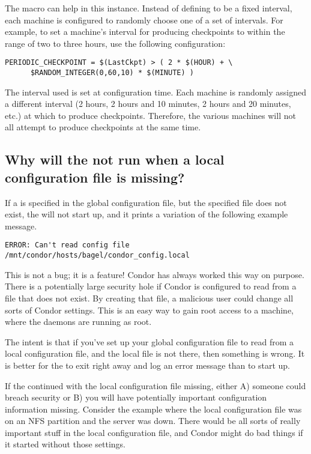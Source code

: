 The  macro can help in this instance.
Instead of defining  to be a fixed
interval, each machine is configured to randomly choose 
one of a set of intervals.
For example, to set a machine's interval for producing checkpoints
to within the range of two to three hours, use the following
configuration:
\footnotesize
\begin{verbatim}
PERIODIC_CHECKPOINT = $(LastCkpt) > ( 2 * $(HOUR) + \
      $RANDOM_INTEGER(0,60,10) * $(MINUTE) )
\end{verbatim}
\normalsize

The interval used is set at configuration time.
Each machine is randomly assigned a different interval 
(2 hours, 2 hours and 10 minutes, 2 hours and 20 minutes, etc.)
at which to produce checkpoints.
Therefore, the various machines will not all attempt to
produce checkpoints at the same time.

\subsection*{Why will the  not run when a local configuration file is missing?}

If a  
is specified in the global configuration file,
but the specified file does not exist,
the  will not start up, and it prints a variation
of the following example message.

\footnotesize
\begin{verbatim}
ERROR: Can't read config file /mnt/condor/hosts/bagel/condor_config.local
\end{verbatim}
\normalsize

This is not a bug; it is a feature!
Condor has always worked this way on purpose.
There is a potentially
large security hole if Condor is configured to read from a file that
does not exist.
By creating that file, a malicious user could
change all sorts of Condor settings.
This is an easy way
to gain root access to a machine,
where the daemons are running as root.

The intent is that
if you've set up your global configuration file to read
from a local configuration file, and the local file is not there,
then something is wrong.
It is better for the  to exit right away and
log an error message than to start up.

If the  continued with the local configuration file
missing, either A) someone could breach security or B) you will have
potentially important configuration information missing.
Consider the example where the local configuration file was on an NFS
partition and the server was down. 
There would be all sorts of
really important stuff in the local configuration file,
and Condor might do bad things if it started without those settings.  

